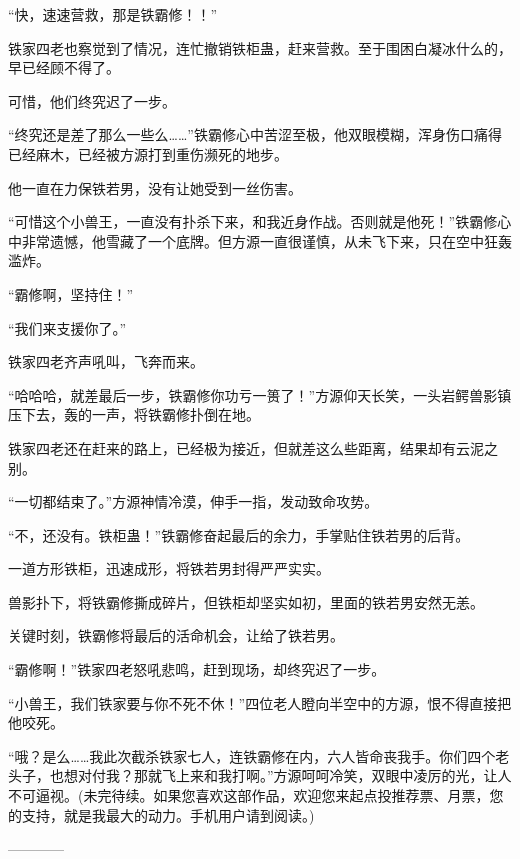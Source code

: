 \begin{this_body}
“快，速速营救，那是铁霸修！！”

铁家四老也察觉到了情况，连忙撤销铁柜蛊，赶来营救。至于围困白凝冰什么的，早已经顾不得了。

可惜，他们终究迟了一步。

“终究还是差了那么一些么……”铁霸修心中苦涩至极，他双眼模糊，浑身伤口痛得已经麻木，已经被方源打到重伤濒死的地步。

他一直在力保铁若男，没有让她受到一丝伤害。

“可惜这个小兽王，一直没有扑杀下来，和我近身作战。否则就是他死！”铁霸修心中非常遗憾，他雪藏了一个底牌。但方源一直很谨慎，从未飞下来，只在空中狂轰滥炸。

“霸修啊，坚持住！”

“我们来支援你了。”

铁家四老齐声吼叫，飞奔而来。

“哈哈哈，就差最后一步，铁霸修你功亏一篑了！”方源仰天长笑，一头岩鳄兽影镇压下去，轰的一声，将铁霸修扑倒在地。

铁家四老还在赶来的路上，已经极为接近，但就差这么些距离，结果却有云泥之别。

“一切都结束了。”方源神情冷漠，伸手一指，发动致命攻势。

“不，还没有。铁柜蛊！”铁霸修奋起最后的余力，手掌贴住铁若男的后背。

一道方形铁柜，迅速成形，将铁若男封得严严实实。

兽影扑下，将铁霸修撕成碎片，但铁柜却坚实如初，里面的铁若男安然无恙。

关键时刻，铁霸修将最后的活命机会，让给了铁若男。

“霸修啊！”铁家四老怒吼悲鸣，赶到现场，却终究迟了一步。

“小兽王，我们铁家要与你不死不休！”四位老人瞪向半空中的方源，恨不得直接把他咬死。

“哦？是么……我此次截杀铁家七人，连铁霸修在内，六人皆命丧我手。你们四个老头子，也想对付我？那就飞上来和我打啊。”方源呵呵冷笑，双眼中凌厉的光，让人不可逼视。(未完待续。如果您喜欢这部作品，欢迎您来起点投推荐票、月票，您的支持，就是我最大的动力。手机用户请到阅读。)

------------

\end{this_body}

